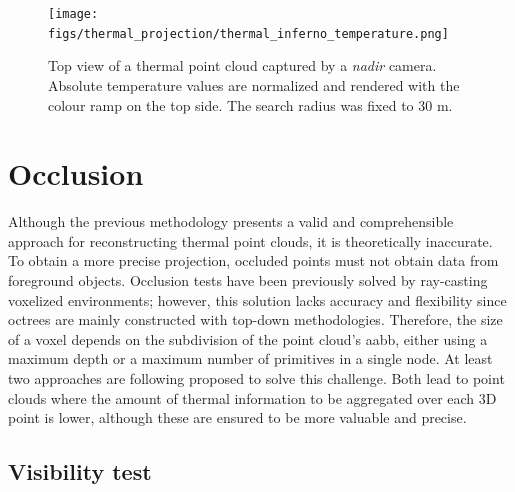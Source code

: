 \begin{figure}[ht]
	\centering
	\texttt{[image: figs/thermal\_projection/thermal\_inferno\_temperature.png]}
	\caption{Top view of a thermal point cloud captured by a \textit{nadir} camera. Absolute temperature values are normalized and rendered with the colour ramp on the top side. The search radius was fixed to 30 \si{\meter}.}
	\label{fig:thermal_point_cloud_top_view}
\end{figure}

\section{Occlusion}

Although the previous methodology presents a valid and comprehensible approach for reconstructing thermal point clouds, it is theoretically inaccurate. To obtain a more precise projection, occluded points must not obtain data from foreground objects. Occlusion tests have been previously solved by ray-casting voxelized environments; however, this solution lacks accuracy and flexibility since octrees are mainly constructed with top-down methodologies. Therefore, the size of a voxel depends on the subdivision of the point cloud's \acrshort{aabb}, either using a maximum depth or a maximum number of primitives in a single node. At least two approaches are following proposed to solve this challenge. Both lead to point clouds where the amount of thermal information to be aggregated over each 3D point is lower, although these are ensured to be more valuable and precise.

\subsection{Visibility test}

